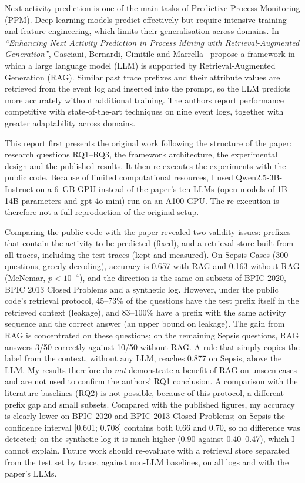 \documentclass[a4paper,12pt,oneside]{report}
\newcommand{\reporttitle}{Enhancing Next Activity Prediction in Process Mining with Retrieval-Augmented Generation}
\begin{document}
Next activity prediction is one of the main tasks of Predictive Process Monitoring (PPM). Deep learning models predict effectively but require intensive training and feature engineering, which limits their generalisation across domains. In \textit{``\reporttitle''}, Casciani, Bernardi, Cimitile and Marrella~\cite{casciani2026} propose a framework in which a large language model (LLM) is supported by Retrieval-Augmented Generation (RAG). Similar past trace prefixes and their attribute values are retrieved from the event log and inserted into the prompt, so the LLM predicts more accurately without additional training. The authors report performance competitive with state-of-the-art techniques on nine event logs, together with greater adaptability across domains.

This report first presents the original work following the structure of the paper: research questions RQ1--RQ3, the framework architecture, the experimental design and the published results. It then re-executes the experiments with the public code. Because of limited computational resources, I used Qwen2.5-3B-Instruct on a 6~GB GPU instead of the paper's ten LLMs (open models of 1B--14B parameters and gpt-4o-mini) run on an A100 GPU. The re-execution is therefore not a full reproduction of the original setup.

Comparing the public code with the paper revealed two validity issues: prefixes that contain the activity to be predicted (fixed), and a retrieval store built from all traces, including the test traces (kept and measured). On Sepsis Cases (300 questions, greedy decoding), accuracy is 0.657 with RAG and 0.163 without RAG (McNemar, $p < 10^{-4}$), and the direction is the same on subsets of BPIC 2020, BPIC 2013 Closed Problems and a synthetic log. However, under the public code's retrieval protocol, 45--73\% of the questions have the test prefix itself in the retrieved context (leakage), and 83--100\% have a prefix with the same activity sequence and the correct answer (an upper bound on leakage). The gain from RAG is concentrated on these questions; on the remaining Sepsis questions, RAG answers 3/50 correctly against 10/50 without RAG. A rule that simply copies the label from the context, without any LLM, reaches 0.877 on Sepsis, above the LLM. My results therefore do \textit{not} demonstrate a benefit of RAG on unseen cases and are not used to confirm the authors' RQ1 conclusion. A comparison with the literature baselines (RQ2) is not possible, because of this protocol, a different prefix gap and small subsets. Compared with the published figures, my accuracy is clearly lower on BPIC 2020 and BPIC 2013 Closed Problems; on Sepsis the confidence interval [0.601; 0.708] contains both 0.66 and 0.70, so no difference was detected; on the synthetic log it is much higher (0.90 against 0.40--0.47), which I cannot explain. Future work should re-evaluate with a retrieval store separated from the test set by trace, against non-LLM baselines, on all logs and with the paper's LLMs.
\end{document}
